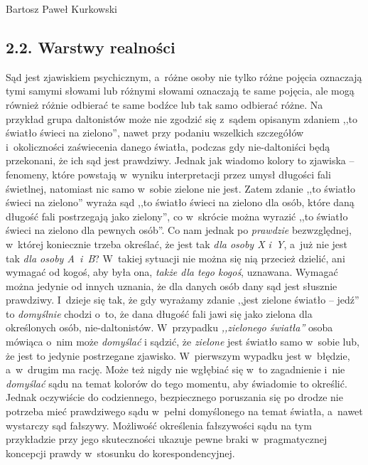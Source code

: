 \begin{artplenv}{Bartosz Paweł Kurkowski}
\subsection{2.2. Warstwy realności}

Sąd jest zjawiskiem psychicznym, a~różne osoby nie tylko różne pojęcia oznaczają tymi samymi słowami lub różnymi słowami
oznaczają te same pojęcia, ale mogą również różnie odbierać te same bodźce lub tak samo odbierać różne. Na przykład
grupa daltonistów może nie zgodzić się z~sądem opisanym zdaniem ,,to światło świeci na zielono'', nawet przy podaniu
wszelkich szczegółów i~okoliczności zaświecenia danego światła, podczas gdy nie-daltoniści będą przekonani, że ich sąd
jest prawdziwy. Jednak jak wiadomo kolory to zjawiska -- fenomeny, które powstają w~wyniku interpretacji przez umysł
długości fali świetlnej, natomiast nic samo w~sobie zielone nie jest. Zatem zdanie ,,to światło świeci na zielono''
wyraża sąd ,,to światło świeci na zielono dla osób, które daną długość fali postrzegają jako zielony'', co w~skrócie
można wyrazić ,,to światło świeci na zielono dla pewnych osób''. Co nam jednak po \textit{prawdzie}
bezwzględnej, w~której koniecznie trzeba określać, że jest
tak \textit{dla osoby X i~Y}, a~już nie jest tak \textit{dla osoby A~i~B}? W~takiej sytuacji nie można się nią
przecież dzielić, ani wymagać od kogoś, aby była ona, \textit{także dla tego kogoś},
uznawana. Wymagać można jedynie od innych uznania, że dla danych osób dany sąd jest słusznie prawdziwy. I~dzieje się
tak, że gdy wyrażamy zdanie ,,jest zielone światło -- jedź'' to \textit{domyślnie }chodzi o~to, że dana długość fali jawi
się jako zielona dla określonych osób, nie-daltonistów. W~przypadku \textit{,,zielonego światła''} osoba mówiąca o~nim
może \textit{domyślać }i sądzić, że \textit{zielone }jest światło samo w~sobie lub, że jest to jedynie postrzegane
zjawisko. W~pierwszym wypadku jest w~błędzie, a~w~drugim ma rację. Może też nigdy nie wgłębiać się w~to
zagadnienie i~nie \textit{domyślać }sądu na temat kolorów do tego momentu, aby świadomie to określić. Jednak oczywiście do
codziennego, bezpiecznego poruszania się po drodze nie potrzeba mieć prawdziwego sądu w~pełni domyślonego na temat
światła, a~nawet wystarczy sąd fałszywy. Możliwość określenia fałszywości sądu na tym przykładzie przy jego
skuteczności ukazuje pewne braki w~pragmatycznej koncepcji prawdy w~stosunku do  korespondencyjnej.



\end{artplenv}
